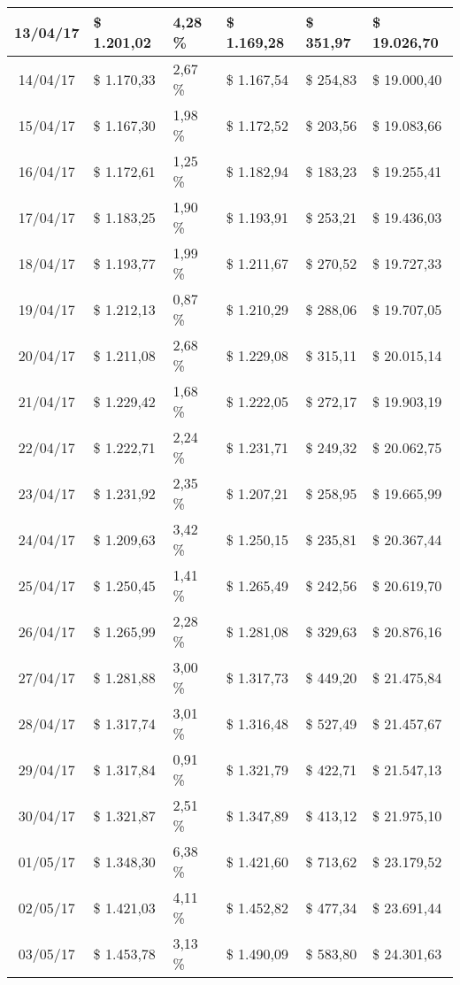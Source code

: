 \begin{small}
\begin{longtable}{|c|l|l|l|l|l|}
13/04/17 & \$ 1.201,02 & 4,28 \% & \$ 1.169,28 & \$ 351,97 & \$ 19.026,70 \\ \hline
14/04/17 & \$ 1.170,33 & 2,67 \% & \$ 1.167,54 & \$ 254,83 & \$ 19.000,40 \\ \hline
15/04/17 & \$ 1.167,30 & 1,98 \% & \$ 1.172,52 & \$ 203,56 & \$ 19.083,66 \\ \hline
16/04/17 & \$ 1.172,61 & 1,25 \% & \$ 1.182,94 & \$ 183,23 & \$ 19.255,41 \\ \hline
17/04/17 & \$ 1.183,25 & 1,90 \% & \$ 1.193,91 & \$ 253,21 & \$ 19.436,03 \\ \hline
18/04/17 & \$ 1.193,77 & 1,99 \% & \$ 1.211,67 & \$ 270,52 & \$ 19.727,33 \\ \hline
19/04/17 & \$ 1.212,13 & 0,87 \% & \$ 1.210,29 & \$ 288,06 & \$ 19.707,05 \\ \hline
20/04/17 & \$ 1.211,08 & 2,68 \% & \$ 1.229,08 & \$ 315,11 & \$ 20.015,14 \\ \hline
21/04/17 & \$ 1.229,42 & 1,68 \% & \$ 1.222,05 & \$ 272,17 & \$ 19.903,19 \\ \hline
22/04/17 & \$ 1.222,71 & 2,24 \% & \$ 1.231,71 & \$ 249,32 & \$ 20.062,75 \\ \hline
23/04/17 & \$ 1.231,92 & 2,35 \% & \$ 1.207,21 & \$ 258,95 & \$ 19.665,99 \\ \hline
24/04/17 & \$ 1.209,63 & 3,42 \% & \$ 1.250,15 & \$ 235,81 & \$ 20.367,44 \\ \hline
25/04/17 & \$ 1.250,45 & 1,41 \% & \$ 1.265,49 & \$ 242,56 & \$ 20.619,70 \\ \hline
26/04/17 & \$ 1.265,99 & 2,28 \% & \$ 1.281,08 & \$ 329,63 & \$ 20.876,16 \\ \hline
27/04/17 & \$ 1.281,88 & 3,00 \% & \$ 1.317,73 & \$ 449,20 & \$ 21.475,84 \\ \hline
28/04/17 & \$ 1.317,74 & 3,01 \% & \$ 1.316,48 & \$ 527,49 & \$ 21.457,67 \\ \hline
29/04/17 & \$ 1.317,84 & 0,91 \% & \$ 1.321,79 & \$ 422,71 & \$ 21.547,13 \\ \hline
30/04/17 & \$ 1.321,87 & 2,51 \% & \$ 1.347,89 & \$ 413,12 & \$ 21.975,10 \\ \hline
01/05/17 & \$ 1.348,30 & 6,38 \% & \$ 1.421,60 & \$ 713,62 & \$ 23.179,52 \\ \hline
02/05/17 & \$ 1.421,03 & 4,11 \% & \$ 1.452,82 & \$ 477,34 & \$ 23.691,44 \\ \hline
03/05/17 & \$ 1.453,78 & 3,13 \% & \$ 1.490,09 & \$ 583,80 & \$ 24.301,63 \\ \hline

\end{longtable}
\end{small}

